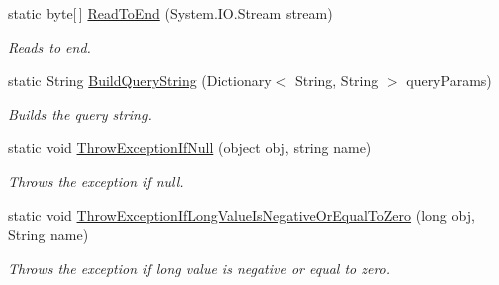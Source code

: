 \begin{DoxyCompactItemize}
static byte\mbox{[}$\,$\mbox{]} \hyperlink{classcom_1_1shephertz_1_1app42_1_1paas_1_1sdk_1_1csharp_1_1util_1_1_util_a65e3cba9c6e8c388e0fe7e9dbd2a0d59}{Read\+To\+End} (System.\+I\+O.\+Stream stream)
\begin{DoxyCompactList}\small\item\em Reads to end. \end{DoxyCompactList}\item 
static String \hyperlink{classcom_1_1shephertz_1_1app42_1_1paas_1_1sdk_1_1csharp_1_1util_1_1_util_ad4ff86883fb671951af758bed1aecddb}{Build\+Query\+String} (Dictionary$<$ String, String $>$ query\+Params)
\begin{DoxyCompactList}\small\item\em Builds the query string. \end{DoxyCompactList}\item 
static void \hyperlink{classcom_1_1shephertz_1_1app42_1_1paas_1_1sdk_1_1csharp_1_1util_1_1_util_a74ba9227ec104b5c9dd0db508041c6db}{Throw\+Exception\+If\+Null} (object obj, string name)
\begin{DoxyCompactList}\small\item\em Throws the exception if null. \end{DoxyCompactList}\item 
static void \hyperlink{classcom_1_1shephertz_1_1app42_1_1paas_1_1sdk_1_1csharp_1_1util_1_1_util_ae2b017609dcaec3093c4168e40c23ff1}{Throw\+Exception\+If\+Long\+Value\+Is\+Negative\+Or\+Equal\+To\+Zero} (long obj, String name)
\begin{DoxyCompactList}\small\item\em Throws the exception if long value is negative or equal to zero. \end{DoxyCompactList}\end{DoxyCompactItemize}


